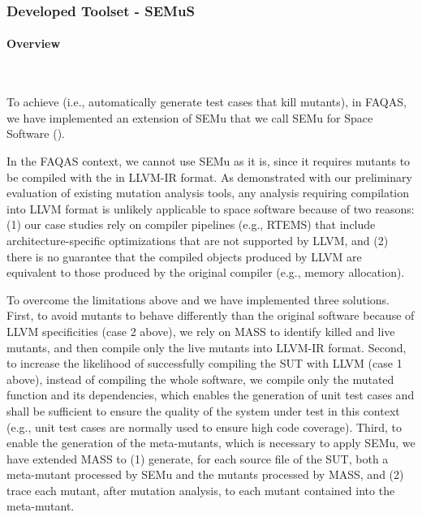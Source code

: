 
\newpage
\subsubsection{Developed Toolset - SEMuS}
\label{sec:semus}

\STARTCHANGEDFINAL
\paragraph{Overview}\ 
\label{sec:semus}





To achieve  (i.e., automatically generate test cases that kill mutants), in FAQAS, we have implemented an extension of SEMu that we call SEMu for Space Software ().



In the FAQAS context, we cannot use SEMu as it is, since it requires mutants to be compiled with the  in LLVM-IR format. As demonstrated with our preliminary evaluation of existing mutation analysis tools, any analysis requiring compilation into LLVM format is unlikely applicable to space software because of two reasons:  (1) our case studies rely on compiler pipelines (e.g., RTEMS) that include architecture-specific optimizations that are not supported by LLVM, and (2) there is no guarantee that the compiled objects produced by LLVM are equivalent to those produced by the original compiler (e.g., memory allocation). 

To overcome the limitations above and  we have implemented three solutions. 
First, to avoid mutants to behave differently than the original software because of LLVM specificities (case 2 above), we rely on  MASS to identify killed and live mutants, and then compile only the live mutants into LLVM-IR format. 
Second, to increase the likelihood of successfully compiling the SUT with LLVM (case 1 above),  instead of compiling the whole software, we compile only the mutated function and its dependencies, which enables the generation of unit test cases and shall be sufficient to ensure the quality of the system under test in this context (e.g., unit test cases are normally used to ensure high code coverage). Third, to enable the generation of the meta-mutants, which is necessary to apply SEMu, we have extended MASS to (1) generate, for each source file of the SUT, both a meta-mutant processed by SEMu and the mutants processed by MASS, and (2) trace each mutant, after mutation analysis, to each mutant contained into the meta-mutant. 





